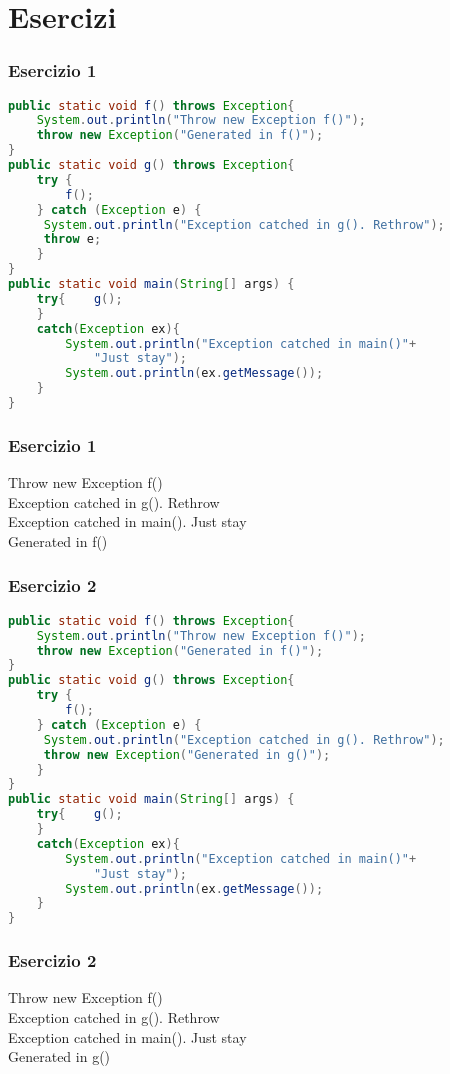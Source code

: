 \documentclass{beamer}
\begin{document}
\section{Esercizi}


\begin{frame}[fragile]
\frametitle{Esercizio 1}
\begin{lstlisting}[language=Java]
public static void f() throws Exception{
    System.out.println("Throw new Exception f()");
    throw new Exception("Generated in f()");
}
public static void g() throws Exception{
    try {
        f();
    } catch (Exception e) {
     System.out.println("Exception catched in g(). Rethrow");
     throw e;
    }
}
public static void main(String[] args) {
    try{    g();
    }
    catch(Exception ex){
        System.out.println("Exception catched in main()"+
            "Just stay");
        System.out.println(ex.getMessage());
    }
}
\end{lstlisting}
\end{frame}

\begin{frame}[fragile]
\frametitle{Esercizio 1}
Throw new Exception f()\\
Exception catched in g(). Rethrow\\
Exception catched in main(). Just stay\\
Generated in f()
\end{frame}

\begin{frame}[fragile]
\frametitle{Esercizio 2}
\begin{lstlisting}[language=Java]
public static void f() throws Exception{
    System.out.println("Throw new Exception f()");
    throw new Exception("Generated in f()");
}
public static void g() throws Exception{
    try {
        f();
    } catch (Exception e) {
     System.out.println("Exception catched in g(). Rethrow");
     throw new Exception("Generated in g()");
    }
}
public static void main(String[] args) {
    try{    g();
    }
    catch(Exception ex){
        System.out.println("Exception catched in main()"+
            "Just stay");
        System.out.println(ex.getMessage());
    }
}
\end{lstlisting}
\end{frame}

\begin{frame}[fragile]
\frametitle{Esercizio 2}
Throw new Exception f()\\
Exception catched in g(). Rethrow\\
Exception catched in main(). Just stay\\
Generated in g()
\end{frame}
\end{document}
